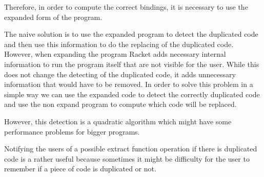 
Therefore, in order to compute the correct bindings, it is necessary to use the expanded form
of the program.

The naive solution is to use the expanded program to detect the duplicated
 code and then use this information to do the replacing of the duplicated code.
However, when expanding the program Racket adds necessary internal information to
run the program itself that are not visible for the user.
While this does not change the detecting of the duplicated code, it adds unnecessary information
that would have to be removed. %
In order to solve this problem in a simple way we can use the expanded code to detect
the correctly duplicated code and use the non expand program
to compute which code will be replaced.

However, this detection is a quadratic algorithm which might
have some performance problems for bigger programs.

Notifying the users of a possible extract function operation if there is duplicated code is a rather
useful because sometimes it might be difficulty for the user to remember if a
piece of code is duplicated or not.
